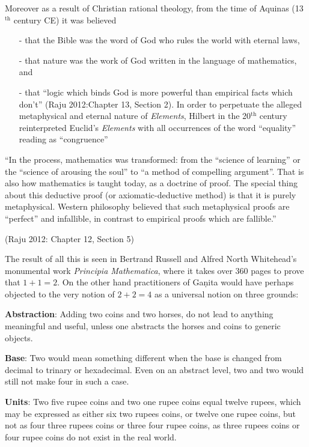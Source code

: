 Moreover as a result of Christian rational theology, from the time of Aquinas (13$^{\text{th}}$ century CE) it was believed 
\begin{itemize}
\item[-] that the Bible was the word of God who rules the world with eternal laws,
\item[-] that nature was the work of God written in the language of mathematics, and 
\item[-] that ``logic which binds God is more powerful than empirical facts which don’t'' (Raju 2012:Chapter 13, Section 2). In order to perpetuate the alleged metaphysical and eternal nature of {\sl Elements}, Hilbert in the 20$^{\text{th}}$ century reinterpreted Euclid’s {\sl Elements} with all occurrences of the word ``equality'' reading as ``congruence''
\end{itemize}
\begin{myquote}
``In the process, mathematics was transformed: from the ``science of learning'' or the ``science of arousing the soul'' to ``a method of compelling argument''. That is also how mathematics is taught today, as a doctrine of proof. The special thing about this deductive proof (or axiomatic-deductive method) is that it is purely metaphysical. Western philosophy believed that such metaphysical proofs are ``perfect'' and infallible, in contrast to empirical proofs which are fallible.''

\hfill 	(Raju 2012: Chapter 12, Section 5)
\end{myquote}

The result of all this is seen in Bertrand Russell and Alfred North Whitehead's monumental work {\sl Principia Mathematica}, where it takes over 360 pages to prove that $1 + 1 = 2$. On the other hand practitioners of Gaṇita would have perhaps objected to the very notion of $2 + 2 =4$ as a universal notion on three grounds:
\begin{myquote}
{{\bf Abstraction}}: Adding two coins and two horses, do not lead to anything meaningful and useful, unless one abstracts the horses and coins to generic objects.

{{\bf Base}}: Two would mean something different when the base is changed from decimal to trinary or hexadecimal. Even on an abstract level, two and two would still not make four in such a case.

{{\bf Units}}: Two five rupee coins and two one rupee coins equal twelve rupees, which may be expressed as either six two rupees coins, or twelve one rupee coins, but not as four three rupees coins or three four rupee coins, as three rupees coins or four rupee coins do not exist in the real world.
\end{myquote}

